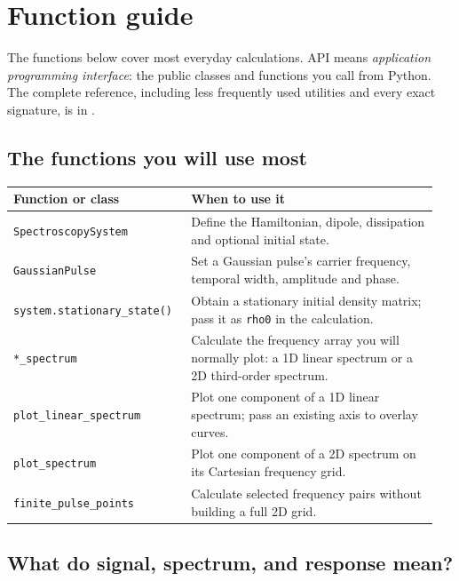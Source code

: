 \section{Function guide}
\label{sec:api-reference}

The functions below cover most everyday calculations. API means
\emph{application programming interface}: the public classes and
functions you call from Python. The complete reference, including
less frequently used utilities and every exact signature, is in
.

\subsection{The functions you will use most}

\begin{tabular}{@{}p{0.39\linewidth}p{0.56\linewidth}@{}}
\toprule
\textbf{Function or class} & \textbf{When to use it} \\
\midrule
\texttt{SpectroscopySystem} & Define the Hamiltonian, dipole, dissipation
and optional initial state. \\
\texttt{GaussianPulse} & Set a Gaussian pulse's carrier frequency, temporal
width, amplitude and phase. \\
\texttt{system.stationary\_state()} & Obtain a stationary initial density
matrix; pass it as \texttt{rho0} in the calculation. \\
\texttt{*\_spectrum} & Calculate the frequency array you will normally
plot: a 1D linear spectrum or a 2D third-order spectrum. \\
\texttt{plot\_linear\_spectrum} & Plot one component of a 1D linear spectrum;
pass an existing axis to overlay curves. \\
\texttt{plot\_spectrum} & Plot one component of a 2D spectrum on its
Cartesian frequency grid. \\
\texttt{finite\_pulse\_points} & Calculate selected frequency pairs
without building a full 2D grid. \\
\bottomrule
\end{tabular}

\subsection{What do signal, spectrum, and response mean?}

